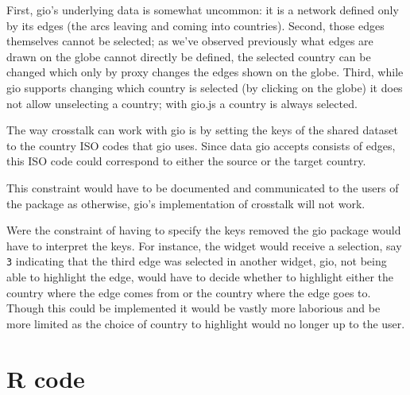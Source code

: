 \documentclass[10pt,]{krantz}
\makeatletter
\newenvironment{Shaded}{\begin{snugshade}}{\end{snugshade}}
\newcommand{\CommentTok}[1]{\textcolor[rgb]{0.37,0.37,0.37}{\textit{#1}}}
\newcommand{\DataTypeTok}[1]{\textcolor[rgb]{0.27,0.27,0.27}{#1}}
\newcommand{\KeywordTok}[1]{\textcolor[rgb]{0.27,0.27,0.27}{\textbf{#1}}}
\newcommand{\NormalTok}[1]{#1}
\newcommand{\OperatorTok}[1]{\textcolor[rgb]{0.43,0.43,0.43}{\textbf{#1}}}
\newcommand{\StringTok}[1]{\textcolor[rgb]{0.5,0.5,0.5}{#1}}
\newenvironment{kframe}{%
\medskip{}
\setlength{\fboxsep}{.8em}
 \def\at@end@of@kframe{}%
 \ifinner\ifhmode%
  \def\at@end@of@kframe{\end{minipage}}%
  \begin{minipage}{\columnwidth}%
 \fi\fi%
 \def\FrameCommand##1{\hskip\@totalleftmargin \hskip-\fboxsep
 \colorbox{shadecolor}{##1}\hskip-\fboxsep
     \hskip-\linewidth \hskip-\@totalleftmargin \hskip\columnwidth}%
 \MakeFramed {\advance\hsize-\width
   \@totalleftmargin\z@ \linewidth\hsize
   \@setminipage}}%
 {\par\unskip\endMakeFramed%
 \at@end@of@kframe}
\renewenvironment{Shaded}{\begin{kframe}}{\end{kframe}}
\makeatother
\begin{document}
First, gio's underlying data is somewhat uncommon: it is a network defined only by its edges (the arcs leaving and coming into countries). Second, those edges themselves cannot be selected; as we've observed previously what edges are drawn on the globe cannot directly be defined, the selected country can be changed which only by proxy changes the edges shown on the globe. Third, while gio supports changing which country is selected (by clicking on the globe) it does not allow unselecting a country; with gio.js a country is always selected.

The way crosstalk can work with gio is by setting the keys of the shared dataset to the country ISO codes that gio uses. Since data gio accepts consists of edges, this ISO code could correspond to either the source or the target country.

\begin{Shaded}
\end{Shaded}

This constraint would have to be documented and communicated to the users of the package as otherwise, gio's implementation of crosstalk will not work.

Were the constraint of having to specify the keys removed the gio package would have to interpret the keys. For instance, the widget would receive a selection, say \texttt{3} indicating that the third edge was selected in another widget, gio, not being able to highlight the edge, would have to decide whether to highlight either the country where the edge comes from or the country where the edge goes to. Though this could be implemented it would be vastly more laborious and be more limited as the choice of country to highlight would no longer up to the user.

\hypertarget{linking-widgets-r}{%
\section{R code}\label{linking-widgets-r}}
\end{document}
